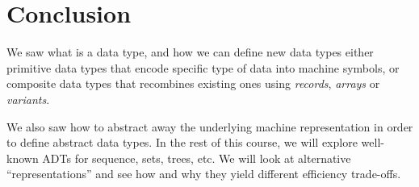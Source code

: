 \documentclass{aldast}
\begin{document}
\section{Conclusion}
We saw what is a data type, and how we can define new data types
either primitive data types that encode specific type of data into
machine symbols, or composite data types that recombines existing
ones using \emph{records}, \emph{arrays} or \emph{variants}.

We also saw how to abstract away the underlying machine representation
in order to define abstract data types. In the rest of this course, we
will explore well-known ADTs for sequence, sets, trees, etc. We will
look at alternative ``representations'' and see how and why they yield
different efficiency trade-offs.



\end{document}
